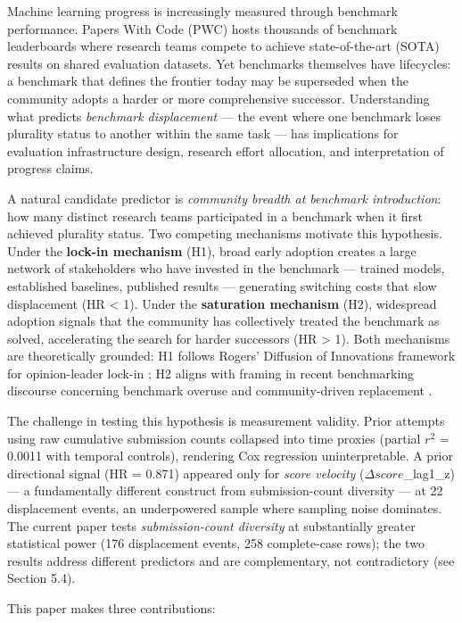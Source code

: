 
Machine learning progress is increasingly measured through benchmark performance. Papers With Code (PWC) hosts thousands of benchmark leaderboards where research teams compete to achieve state-of-the-art (SOTA) results on shared evaluation datasets. Yet benchmarks themselves have lifecycles: a benchmark that defines the frontier today may be superseded when the community adopts a harder or more comprehensive successor. Understanding what predicts \textit{benchmark displacement} --- the event where one benchmark loses plurality status to another within the same task --- has implications for evaluation infrastructure design, research effort allocation, and interpretation of progress claims.

A natural candidate predictor is \textit{community breadth at benchmark introduction}: how many distinct research teams participated in a benchmark when it first achieved plurality status. Two competing mechanisms motivate this hypothesis. Under the \textbf{lock-in mechanism} (H1), broad early adoption creates a large network of stakeholders who have invested in the benchmark --- trained models, established baselines, published results --- generating switching costs that slow displacement (HR < 1). Under the \textbf{saturation mechanism} (H2), widespread adoption signals that the community has collectively treated the benchmark as solved, accelerating the search for harder successors (HR > 1). Both mechanisms are theoretically grounded: H1 follows Rogers' Diffusion of Innovations framework for opinion-leader lock-in \cite{rogers2003diffusion}; H2 aligns with framing in recent benchmarking discourse concerning benchmark overuse and community-driven replacement \cite{iclr2025benchmarking}.

The challenge in testing this hypothesis is measurement validity. Prior attempts using raw cumulative submission counts collapsed into time proxies (partial $r^2$ = 0.0011 with temporal controls), rendering Cox regression uninterpretable. A prior directional signal (HR = 0.871) appeared only for \textit{score velocity} ($\Delta score$\_lag1\_z) --- a fundamentally different construct from submission-count diversity --- at 22 displacement events, an underpowered sample where sampling noise dominates. The current paper tests \textit{submission-count diversity} at substantially greater statistical power (176 displacement events, 258 complete-case rows); the two results address different predictors and are complementary, not contradictory (see Section 5.4).

This paper makes three contributions:

